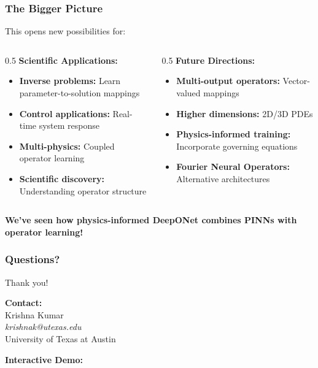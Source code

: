 \documentclass[notes]{beamer}
\begin{document}
\begin{frame}
\frametitle{The Bigger Picture}

This opens new possibilities for:

\begin{columns}[T]
    \begin{column}{0.5\textwidth}
        \textbf{Scientific Applications:}
        \begin{itemize}
            \item \textbf{Inverse problems:} Learn parameter-to-solution mappings
            \item \textbf{Control applications:} Real-time system response
            \item \textbf{Multi-physics:} Coupled operator learning
            \item \textbf{Scientific discovery:} Understanding operator structure
        \end{itemize}
    \end{column}
    \begin{column}{0.5\textwidth}
        \textbf{Future Directions:}
        \begin{itemize}
            \item \textbf{Multi-output operators:} Vector-valued mappings
            \item \textbf{Higher dimensions:} 2D/3D PDEs
            \item \textbf{Physics-informed training:} Incorporate governing equations
            \item \textbf{Fourier Neural Operators:} Alternative architectures
        \end{itemize}
    \end{column}
\end{columns}

\vspace{1cm}

\begin{center}
\textbf{We've seen how physics-informed DeepONet combines PINNs with operator learning!}
\end{center}

\end{frame}

\begin{frame}
\frametitle{Questions?}

\centering
\Large Thank you!

\vspace{2cm}

\textbf{Contact:} \\
Krishna Kumar \\
\textit{krishnak@utexas.edu} \\
University of Texas at Austin

\vspace{1cm}

\textbf{Interactive Demo:} \\
\href{https://colab.research.google.com/github/kks32-courses/sciml/blob/main/docs/02-deeponet/deeponet.ipynb}{}

\end{frame}
\end{document}
